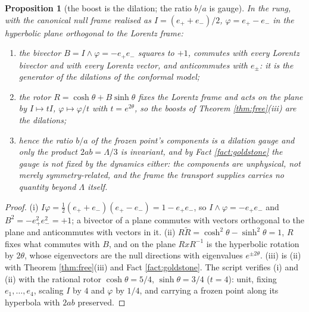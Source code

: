 \documentclass[11pt]{article}
\newtheorem{proposition}[theorem]{Proposition}
\theoremstyle{definition}
\begin{document}
\begin{proposition}[the boost is the dilation; the ratio $b/a$ is gauge]\label{prop:dilation}
In the rung, with the canonical null frame realised as $I = (e_{+} + e_{-})/2$, $\varphi = e_{+} - e_{-}$ in the hyperbolic plane orthogonal to the Lorentz frame:
\begin{enumerate}
\item[(i)] the bivector $B = I \wedge \varphi = -e_{+}e_{-}$ squares to $+1$, commutes with every Lorentz bivector and with every Lorentz vector, and anticommutes with $e_{\pm}$: it is the generator of the dilations of the conformal model;
\item[(ii)] the rotor $R = \cosh\theta + B\sinh\theta$ fixes the Lorentz frame and acts on the plane by $I \mapsto tI$, $\varphi \mapsto \varphi/t$ with $t = e^{2\theta}$, so the boosts of Theorem \ref{thm:free}(iii) are the dilations;
\item[(iii)] hence the ratio $b/a$ of the frozen point's components is a dilation gauge and only the product $2ab = \Lambda/3$ is invariant, and by Fact \ref{fact:goldstone} the gauge is not fixed by the dynamics either: the components are unphysical, not merely symmetry-related, and the frame the transport supplies carries no quantity beyond $\Lambda$ itself.
\end{enumerate}
\end{proposition}

\begin{proof}
(i) $I\varphi = \tfrac12(e_{+} + e_{-})(e_{+} - e_{-}) = 1 - e_{+}e_{-}$, so $I \wedge \varphi = -e_{+}e_{-}$ and $B^{2} = -e_{+}^{2}e_{-}^{2} = +1$; a bivector of a plane commutes with vectors orthogonal to the plane and anticommutes with vectors in it. (ii) $R\tilde R = \cosh^{2}\theta - \sinh^{2}\theta = 1$, $R$ fixes what commutes with $B$, and on the plane $RxR^{-1}$ is the hyperbolic rotation by $2\theta$, whose eigenvectors are the null directions with eigenvalues $e^{\pm 2\theta}$. (iii) is (ii) with Theorem \ref{thm:free}(iii) and Fact \ref{fact:goldstone}. The script verifies (i) and (ii) with the rational rotor $\cosh\theta = 5/4$, $\sinh\theta = 3/4$ ($t = 4$): unit, fixing $e_{1}, \ldots, e_{4}$, scaling $I$ by $4$ and $\varphi$ by $1/4$, and carrying a frozen point along its hyperbola with $2ab$ preserved.
\end{proof}
\end{document}
